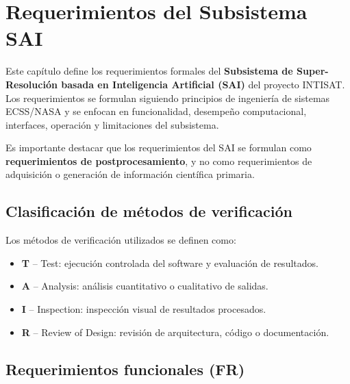 \chapter{Requerimientos del Subsistema SAI}
\label{ch:requerimientos}

Este capítulo define los requerimientos formales del \textbf{Subsistema de
Super-Resolución basada en Inteligencia Artificial (SAI)} del proyecto INTISAT.
Los requerimientos se formulan siguiendo principios de ingeniería de sistemas
ECSS/NASA y se enfocan en funcionalidad, desempeño computacional, interfaces,
operación y limitaciones del subsistema.

Es importante destacar que los requerimientos del SAI se formulan como
\textbf{requerimientos de postprocesamiento}, y no como requerimientos de
adquisición o generación de información científica primaria.

\section{Clasificación de métodos de verificación}

Los métodos de verificación utilizados se definen como:

\begin{itemize}
    \item \textbf{T} -- Test: ejecución controlada del software y evaluación de
    resultados.
    \item \textbf{A} -- Analysis: análisis cuantitativo o cualitativo de salidas.
    \item \textbf{I} -- Inspection: inspección visual de resultados procesados.
    \item \textbf{R} -- Review of Design: revisión de arquitectura, código o
    documentación.
\end{itemize}

\section{Requerimientos funcionales (FR)}

